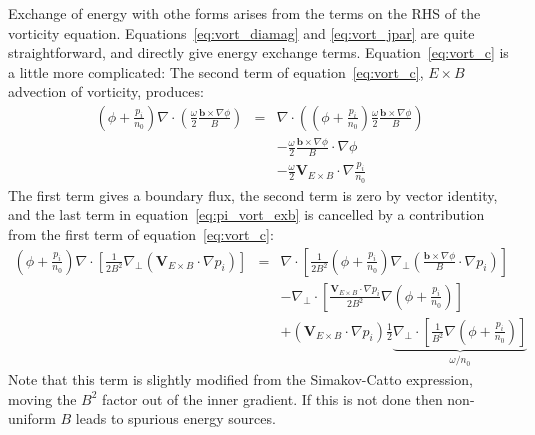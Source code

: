 \documentclass[12pt,a4paper]{article}
\begin{document}
Exchange of energy with othe forms arises from the terms on the RHS of the vorticity equation.
Equations~\ref{eq:vort_diamag} and \ref{eq:vort_jpar} are quite straightforward, and directly give energy exchange terms. Equation~\ref{eq:vort_c} is a little more complicated: The second term of equation~\ref{eq:vort_c}, $E\times B$ advection of vorticity, produces: 
\begin{eqnarray}
\left(\phi + \frac{p_i}{n_0}\right)\nabla\cdot\left(\frac{\omega}{2}\frac{\mathbf{b}\times\nabla\phi}{B}\right) &=& \nabla\cdot\left(\left(\phi + \frac{p_i}{n_0}\right)\frac{\omega}{2}\frac{\mathbf{b}\times\nabla\phi}{B}\right) \nonumber \\
&& - \frac{\omega}{2} \frac{\mathbf{b}\times\nabla\phi}{B}\cdot\nabla\phi \nonumber \\
&& - \frac{\omega}{2} \mathbf{V}_{E\times B}\cdot\nabla \frac{p_i}{n_0} \label{eq:pi_vort_exb}
\end{eqnarray}
The first term gives a boundary flux, the second term is zero by vector identity, and the last term in equation~\ref{eq:pi_vort_exb} is cancelled by a contribution from the first term of equation~\ref{eq:vort_c}:
\begin{eqnarray*}
  \left(\phi + \frac{p_i}{n_0}\right)\nabla\cdot\left[\frac{1}{2B^2}\nabla_\perp\left(\mathbf{V}_{E\times B}\cdot\nabla p_i\right)\right] &=& \nabla\cdot\left[\frac{1}{2B^2}\left(\phi + \frac{p_i}{n_0}\right)\nabla_\perp\left(\frac{\mathbf{b}\times\nabla\phi}{B}\cdot\nabla p_i\right)\right] \\
  && - \nabla_\perp\cdot\left[\frac{\mathbf{V}_{E\times B}\cdot\nabla p_i}{2B^2}\nabla\left(\phi + \frac{p_i}{n_0}\right)\right] \\
  && + \left(\mathbf{V}_{E\times B}\cdot\nabla p_i\right)\frac{1}{2}\underbrace{\nabla_\perp\cdot\left[\frac{1}{B^2}\nabla\left(\phi + \frac{p_i}{n_0}\right)\right]}_{\omega / n_0}
\end{eqnarray*}
Note that this term is slightly modified from the Simakov-Catto expression, moving the $B^2$ factor out of the inner gradient.
If this is not done then non-uniform $B$ leads to spurious energy sources.
\end{document}
